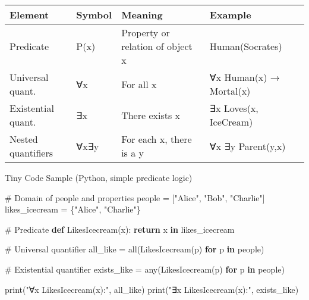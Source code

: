 \documentclass[
  letterpaper,
  DIV=11,
  numbers=noendperiod]{scrreprt}
\newenvironment{Shaded}{\begin{snugshade}}{\end{snugshade}}
\newcommand{\BuiltInTok}[1]{\textcolor[rgb]{0.00,0.23,0.31}{#1}}
\newcommand{\CommentTok}[1]{\textcolor[rgb]{0.37,0.37,0.37}{#1}}
\newcommand{\ControlFlowTok}[1]{\textcolor[rgb]{0.00,0.23,0.31}{\textbf{#1}}}
\newcommand{\KeywordTok}[1]{\textcolor[rgb]{0.00,0.23,0.31}{\textbf{#1}}}
\newcommand{\NormalTok}[1]{\textcolor[rgb]{0.00,0.23,0.31}{#1}}
\newcommand{\OperatorTok}[1]{\textcolor[rgb]{0.37,0.37,0.37}{#1}}
\newcommand{\StringTok}[1]{\textcolor[rgb]{0.13,0.47,0.30}{#1}}
\begin{document}
\begin{longtable}[]{@{}
  >{\raggedright\arraybackslash}p{}
  >{\raggedright\arraybackslash}p{}
  >{\raggedright\arraybackslash}p{}
  >{\raggedright\arraybackslash}p{}@{}}
\toprule\noalign{}
\begin{minipage}[b]{\linewidth}\raggedright
Element
\end{minipage} & \begin{minipage}[b]{\linewidth}\raggedright
Symbol
\end{minipage} & \begin{minipage}[b]{\linewidth}\raggedright
Meaning
\end{minipage} & \begin{minipage}[b]{\linewidth}\raggedright
Example
\end{minipage} \\
\midrule\noalign{}
\endhead
\bottomrule\noalign{}
\endlastfoot
Predicate & P(x) & Property or relation of object x & Human(Socrates) \\
Universal quant. & ∀x & For all x & ∀x Human(x) → Mortal(x) \\
Existential quant. & ∃x & There exists x & ∃x Loves(x, IceCream) \\
Nested quantifiers & ∀x∃y & For each x, there is a y & ∀x ∃y
Parent(y,x) \\
\end{longtable}

Tiny Code Sample (Python, simple predicate logic)

\begin{Shaded}
\begin{Highlighting}[]
\CommentTok{\# Domain of people and properties}
\NormalTok{people }\OperatorTok{=}\NormalTok{ [}\StringTok{"Alice"}\NormalTok{, }\StringTok{"Bob"}\NormalTok{, }\StringTok{"Charlie"}\NormalTok{]}
\NormalTok{likes\_icecream }\OperatorTok{=}\NormalTok{ \{}\StringTok{"Alice"}\NormalTok{, }\StringTok{"Charlie"}\NormalTok{\}}

\CommentTok{\# Predicate}
\KeywordTok{def}\NormalTok{ LikesIcecream(x):}
    \ControlFlowTok{return}\NormalTok{ x }\KeywordTok{in}\NormalTok{ likes\_icecream}

\CommentTok{\# Universal quantifier}
\NormalTok{all\_like }\OperatorTok{=} \BuiltInTok{all}\NormalTok{(LikesIcecream(p) }\ControlFlowTok{for}\NormalTok{ p }\KeywordTok{in}\NormalTok{ people)}

\CommentTok{\# Existential quantifier}
\NormalTok{exists\_like }\OperatorTok{=} \BuiltInTok{any}\NormalTok{(LikesIcecream(p) }\ControlFlowTok{for}\NormalTok{ p }\KeywordTok{in}\NormalTok{ people)}

\BuiltInTok{print}\NormalTok{(}\StringTok{"∀x LikesIcecream(x):"}\NormalTok{, all\_like)}
\BuiltInTok{print}\NormalTok{(}\StringTok{"∃x LikesIcecream(x):"}\NormalTok{, exists\_like)}
\end{Highlighting}
\end{Shaded}
\end{document}
